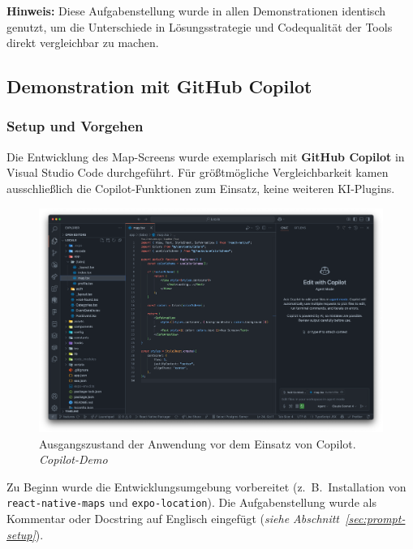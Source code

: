 \noindent
\textbf{Hinweis:} Diese Aufgabenstellung wurde in allen Demonstrationen identisch genutzt, um die Unterschiede in Lösungsstrategie und Codequalität der Tools direkt vergleichbar zu machen.

\subsection{Demonstration mit GitHub Copilot}

\subsubsection{Setup und Vorgehen}
Die Entwicklung des Map-Screens wurde exemplarisch mit \textbf{GitHub Copilot}
in Visual Studio Code durchgeführt. Für größtmögliche Vergleichbarkeit kamen
ausschließlich die Copilot-Funktionen zum Einsatz, keine weiteren KI-Plugins.

\begin{figure}[htbp]
      \centering
      \includegraphics[width=1\textwidth]{images/copilot_screenshots/Screenshots Ist-Zustand-copilot.png}
      \caption{Ausgangszustand der Anwendung vor dem Einsatz von Copilot. \textit{Copilot-Demo}}
      \label{fig:copilot-istzustand}
\end{figure}

Zu Beginn wurde die Entwicklungsumgebung vorbereitet (z.~B.\ Installation von
\texttt{react-native-maps} und \texttt{expo-location}). Die Aufgabenstellung
wurde als Kommentar oder Docstring auf Englisch eingefügt (\emph{siehe
      Abschnitt~\ref{sec:prompt-setup}}).

